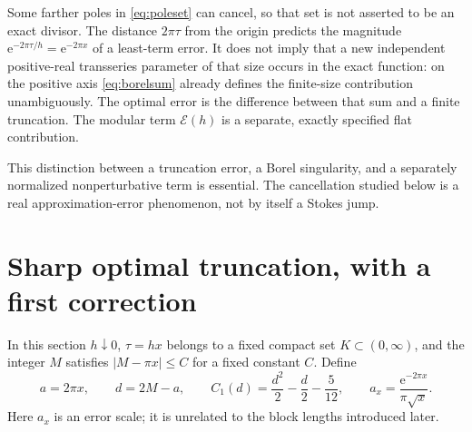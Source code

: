 \documentclass[11pt,a4paper]{article}
\newcommand{\ee}{\mathrm e}
\newcommand{\E}{\mathcal E}
\numberwithin{equation}{section}
\theoremstyle{plain}
\theoremstyle{definition}
\theoremstyle{remark}
\begin{document}
Some farther poles in \eqref{eq:poleset} can cancel, so that set is not
asserted to be an exact divisor. The distance $2\pi\tau$ from the origin
predicts the magnitude $\ee^{-2\pi\tau/h}=\ee^{-2\pi x}$ of a least-term
error. It does not imply that a new independent positive-real transseries
parameter of that size occurs in the exact function: on the positive axis
\eqref{eq:borelsum} already defines the finite-size contribution unambiguously.
The optimal error is the difference between that sum and a finite truncation.
The modular term $\E(h)$ is a separate, exactly specified flat contribution.

This distinction between a truncation error, a Borel singularity, and a
separately normalized nonperturbative term is essential. The cancellation
studied below is a real approximation-error phenomenon, not by itself a
Stokes jump.

\section{Sharp optimal truncation, with a first correction}
\label{sec:optimal}

In this section $h\downarrow0$, $\tau=hx$ belongs to a fixed compact set
$K\subset(0,\infty)$, and the integer $M$ satisfies $|M-\pi x|\le C$ for a
fixed constant $C$. Define
\begin{equation}
 a=2\pi x,\qquad d=2M-a,\qquad
 C_1(d)=\frac{d^2}{2}-\frac d2-\frac5{12},\qquad
 a_x=\frac{\ee^{-2\pi x}}{\pi\sqrt{x}}.
 \label{eq:ad}
\end{equation}
Here $a_x$ is an error scale; it is unrelated to the block lengths introduced
later.
\end{document}
